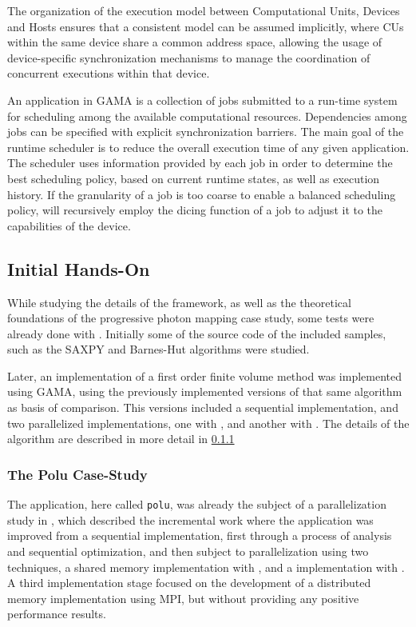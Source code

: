 \documentclass[main.tex]{subfiles}
\begin{document}
The organization of the execution model between Computational Units, Devices and Hosts ensures that a consistent model can be assumed implicitly, where \acsp{CU} within the same device share a common address space, allowing the usage of device-specific synchronization mechanisms to manage the coordination of concurrent executions within that device.

An application in GAMA is a collection of jobs submitted to a run-time system for scheduling among the available computational resources. Dependencies among jobs can be specified with explicit synchronization barriers. The main goal of the runtime scheduler is to reduce the overall execution time of any given application. The scheduler uses information provided by each job in order to determine the best scheduling policy, based on current runtime states, as well as execution history. If the granularity of a job is too coarse to enable a balanced scheduling policy, \gama will recursively employ the dicing function of a job to adjust it to the capabilities of the device.





\subsection{Initial \gama Hands-On}

While studying the details of the framework, as well as the theoretical foundations of the progressive photon mapping case study, some tests were already done with \gama. Initially some of the source code of the included samples, such as the SAXPY and Barnes-Hut algorithms were studied.

Later, an implementation of a first order finite volume method was implemented using GAMA, using the previously implemented versions of that same algorithm as basis of comparison. This versions included a sequential implementation, and two parallelized implementations, one with \openmp, and another with \cuda. The details of the algorithm are described in more detail in \cref{sec:polu}

\subsubsection{The Polu Case-Study} \label{sec:polu}

The application, here called \texttt{polu}, was already the subject of a parallelization study in \cite{naps2012}, which described the incremental work where the application was improved from a sequential implementation, first through a process of analysis and sequential optimization, and then subject to parallelization using two techniques, a shared memory \cpu implementation with \openmp, and a \gpu implementation with \cuda. A third implementation stage focused on the development of a distributed memory implementation using \acs{MPI}, but without providing any positive performance results.
\end{document}
